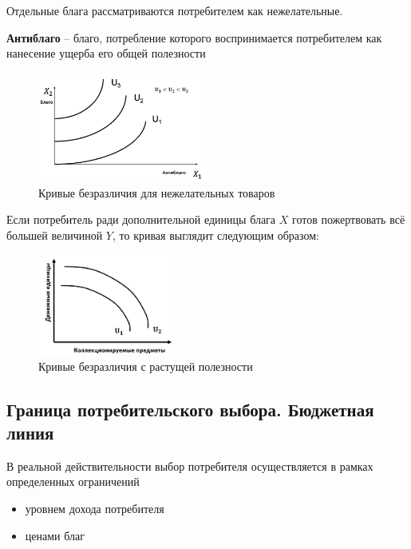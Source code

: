 \documentclass[reqno]{article}
\theoremstyle{definition}
\theoremstyle{definition}
\theoremstyle{definition}
\theoremstyle{definition}
\theoremstyle{definition}
\theoremstyle{definition}
\theoremstyle{definition}
\theoremstyle{definition}
\theoremstyle{definition}
\begin{document}
		Отдельные блага рассматриваются потребителем как нежелательные.
				
		\textbf{Антиблаго} -- благо, потребление которого воспринимается потребителем как нанесение ущерба его общей полезности
		
		\begin{figure}[h!]
			\centering
			\includegraphics[width=0.5\textwidth]{Антиблага}
			\caption{Кривые безразличия для нежелательных товаров}
		\end{figure}
		
		Если потребитель ради дополнительной единицы блага $X$ готов пожертвовать всё большей величиной $Y$, то кривая выглядит следующим образом:
		
		\begin{figure}[h!]
			\centering
			\includegraphics[width=0.4\textwidth]{Кривые_безразличия_с_раст_нормой_полезности}
			\caption{Кривые безразличия с растущей полезности}
		\end{figure}
		
		\subsection{Граница потребительского выбора. Бюджетная линия}
			
		В реальной действительности выбор потребителя осуществляется в рамках определенных ограничений
		
		\begin{itemize}
			\item уровнем дохода потребителя
			
			\item ценами благ
		\end{itemize}
	
\end{document}
